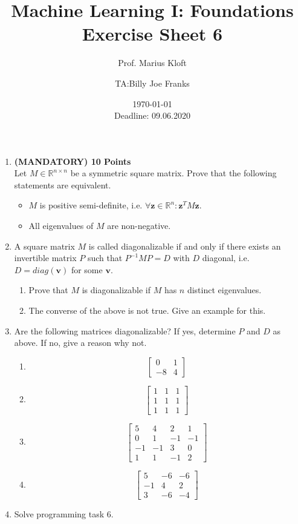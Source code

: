 \documentclass[]{scrartcl}
\author{Prof. Marius Kloft \and TA:Billy Joe Franks}
\title{Machine Learning I: Foundations \\ Exercise Sheet 6}
\date{\today\\Deadline: 09.06.2020}
\newcommand{\R}{\mathbb{R}}
\newcommand{\bv}{\mathbf{v}}
\newcommand{\bz}{\mathbf{z}}
\begin{document}
\maketitle

\begin{enumerate}

\item \textbf{(MANDATORY) 10 Points}\\ Let $M\in\R^{n\times n}$ be a symmetric square matrix. Prove that the following statements are equivalent.
\begin{itemize}
\item $M$ is positive semi-definite, i.e. $\forall \bz\in\R^n: \bz^TM\bz$.
\item All eigenvalues of $M$ are non-negative.
\end{itemize}

\item A square matrix $M$ is called diagonalizable if and only if there exists an invertible matrix $P$ such that $P^{-1}MP=D$ with $D$ diagonal, i.e. $D=diag(\bv)$ for some $\bv$.
\begin{enumerate}
\item Prove that $M$ is diagonalizable if $M$ has $n$ distinct eigenvalues.
\item The converse of the above is not true. Give an example for this.
\end{enumerate}

\newpage
\item Are the following matrices diagonalizable? If yes, determine $P$ and $D$ as above. If no, give a reason why not.
\begin{enumerate}
\item \[\begin{bmatrix}0&1\\-8&4\end{bmatrix}\]
\item \[\begin{bmatrix}1&1&1\\1&1&1\\1&1&1\end{bmatrix}\]
\item \[\begin{bmatrix}5&4&2&1\\0&1&-1&-1\\-1&-1&3&0\\1&1&-1&2\end{bmatrix}\]
\item \[\begin{bmatrix}5&-6&-6\\-1&4&2\\3&-6&-4\end{bmatrix}\]
\end{enumerate}
\item Solve programming task 6.
\end{enumerate}
\end{document}

